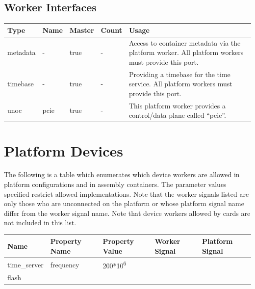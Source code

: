 \documentclass{article}
\begin{document}
\begin{landscape}
	\section*{Worker Interfaces}
	\begin{scriptsize}
		\begin{tabular}{|M{2cm}|M{2cm}|M{1.5cm}|M{1.5cm}|M{14.5cm}|}
			\hline
			Type       & Name & Master & Count & Usage                  \\
			\hline
			metadata   & -    & true   & -     & Access to container metadata via the platform worker. All platform workers must provide this port. \\
			\hline
			timebase   & -    & true   & -     & Providing a timebase for the time service. All platform workers must provide this port. \\
			\hline
			unoc       & pcie & true   & -     & This platform worker provides a control/data plane called ``pcie''. \\
			\hline
		\end{tabular}
	\end{scriptsize}

\end{landscape}
\pagebreak
	\section*{Platform Devices}
	The following is a table which enumerates which device workers are allowed in platform configurations and in assembly containers. The parameter values specified restrict allowed implementations. Note that the worker signals listed are only those who are unconnected on the platform or whose platform signal name differ from the worker signal name. Note that device workers allowed by cards are not included in this list.\\
			\begin{tabular}{|M{3cm}|M{3.5cm}|M{3cm}|M{3cm}|M{3cm}|}
			\hline
			Name                       & Property Name    & Property Value              & Worker Signal & Platform Signal         \\
			\hline
			time\_server               & frequency        & 200*10\textsuperscript{6}   &               &                         \\
			\hline
			flash &   &   &  &  \\
			\hline
		\end{tabular}
\end{document}
